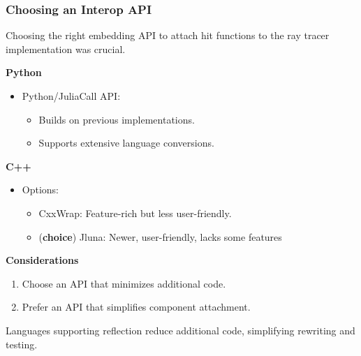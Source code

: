 
\begin{frame}
    \frametitle{Choosing an Interop API}
    
    Choosing the right embedding API to attach hit functions to the ray tracer implementation was crucial.
    
    \pause
    
    \textbf{Python}
    \begin{itemize}
        \item Python/JuliaCall API:
        \begin{itemize}
            \item Builds on previous implementations.
            \item Supports extensive language conversions.
        \end{itemize}
    \end{itemize}
    
    \pause
    
    \textbf{C++}
    \begin{itemize}
        \item Options:
        \begin{itemize}
            \item CxxWrap: Feature-rich but less user-friendly.
            \item (\textbf{choice}) Jluna: Newer, user-friendly, lacks some features
        \end{itemize}
    \end{itemize}
    
    \pause
    
    \textbf{Considerations}
    \begin{enumerate}
        \item Choose an API that minimizes additional code.
        \item Prefer an API that simplifies component attachment.
    \end{enumerate}
    
    \pause
    
    Languages supporting reflection reduce additional code, simplifying rewriting and testing.
    
    \end{frame}